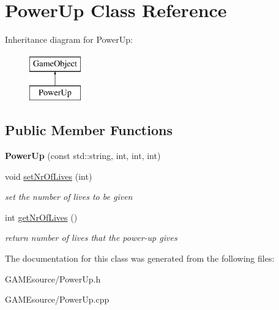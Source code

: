 \hypertarget{class_power_up}{}\section{Power\+Up Class Reference}
\label{class_power_up}
Inheritance diagram for Power\+Up\+:\begin{figure}[H]
\begin{center}
\leavevmode
\includegraphics[height=2.000000cm]{class_power_up}
\end{center}
\end{figure}
\subsection*{Public Member Functions}
\begin{DoxyCompactItemize}
\item 
\mbox{\label{class_power_up_a1146d214489e9f66e80b0d9905ce6aef}} 
{\bfseries Power\+Up} (const std\+::string, int, int, int)
\item 
\mbox{\label{class_power_up_a0358e4edc1c61e26e0c7018b3ebef118}} 
void \mbox{\hyperlink{class_power_up_a0358e4edc1c61e26e0c7018b3ebef118}{set\+Nr\+Of\+Lives}} (int)
\begin{DoxyCompactList}\small\item\em set the number of lives to be given \end{DoxyCompactList}\item 
\mbox{\label{class_power_up_a20b1f2fa6a06891bdac68103f16816f1}} 
int \mbox{\hyperlink{class_power_up_a20b1f2fa6a06891bdac68103f16816f1}{get\+Nr\+Of\+Lives}} ()
\begin{DoxyCompactList}\small\item\em return number of lives that the power-\/up gives \end{DoxyCompactList}\end{DoxyCompactItemize}


The documentation for this class was generated from the following files\+:\begin{DoxyCompactItemize}
\item 
G\+A\+M\+Esource/Power\+Up.\+h\item 
G\+A\+M\+Esource/Power\+Up.\+cpp\end{DoxyCompactItemize}
